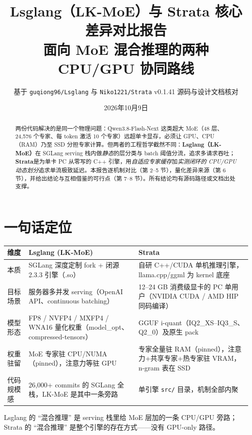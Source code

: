 \documentclass[11pt,a4paper]{ctexart}
\title{\bfseries Lsglang（LK-MoE）与 Strata 核心差异对比报告\\[6pt]
  \large 面向 MoE 混合推理的两种 CPU/GPU 协同路线}
\author{基于 \texttt{guqiong96/Lsglang} 与 \texttt{Niko1221/Strata} v0.1.41 源码与设计文档核对}
\date{2026年10月9日}
\newcommand{\code}[1]{{\footnotesize\color{kwcol}\ttfamily\detokenize{#1}}}
\begin{document}
\maketitle
\begin{abstract}
\noindent
两份代码解决的是同一个物理问题：Qwen3.8-Flash-Next 这类超大 MoE（48 层、24{,}576 个专家、每 token 激活 10 个专家）远超单卡显存，必须让 GPU、CPU（RAM）乃至 SSD 分担专家计算。但两者的工程哲学截然不同：\textbf{Lsglang（LK-MoE）}在 SGLang serving 栈内做\emph{静态}的层分类与 batch 阈值分流，追求多请求吞吐；\textbf{Strata}是为单卡 PC 从零写的 C++ 引擎，用\emph{自适应专家缓存}加\emph{实测闭环的 CPU/GPU 动态划分}追求单流极致延迟。本报告逐机制对比（第 2--5 节），量化差异来源（第 6 节），并给出结论与互相借鉴的可行点（第 7--8 节）。所有结论均有源码路径或文档出处支撑。
\end{abstract}

\tableofcontents
\newpage

\section{一句话定位}

\begin{center}
\begin{tabular}{@{}p{3.2cm}p{6.1cm}p{6.1cm}@{}}
\toprule
\rowcolor{tabhead}
\textbf{维度} & \textbf{Lsglang (LK-MoE)} & \textbf{Strata} \\
\midrule
本质 & SGLang 深度定制 fork + 闭源 \code{lk\_moe} 2.3.3 引擎（.so） & 自研 C++/CUDA 单机推理引擎，llama.cpp/ggml 为 kernel 底座 \\
目标场景 & 服务器多并发 serving（OpenAI API、continuous batching） & 12--24 GB 消费级显卡的 PC 单用户（NVIDIA CUDA / AMD HIP 同码编译） \\
模型形态 & FP8 / NVFP4 / MXFP4 / WNA16 量化权重（model\_opt、compressed-tensors） & GGUF i-quant（IQ2\_XS--IQ3\_S、Q2\_0）及原生 pack \\
权重驻留 & MoE 专家驻 CPU/NUMA（pinned），注意力等驻 GPU & 专家全量驻 RAM（pinned），注意力+共享专家+热专家驻 VRAM，n-gram 表在 SSD \\
代码规模感 & 26{,}000+ commits 的 SGLang 全栈，LK-MoE 是其中一条旁路 & 单引擎 \texttt{src/} 目录，机制全部内聚 \\
\bottomrule
\end{tabular}
\end{center}

Lsglang 的 ``混合推理'' 是 serving 栈里给 MoE 层加的一条 CPU/GPU 旁路；Strata 的 ``混合推理'' 是整个引擎的存在方式——没有 GPU-only 路径。
\end{document}

